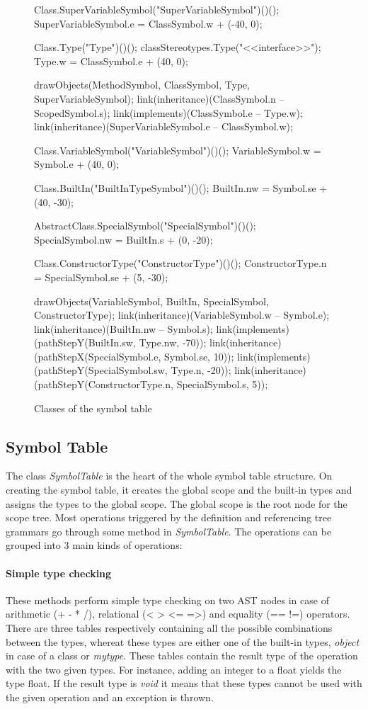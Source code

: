 \begin{figure}[H]
\begin{emp}[classdiag]
	Class.SuperVariableSymbol("SuperVariableSymbol")()();
	SuperVariableSymbol.e = ClassSymbol.w + (-40, 0);

	Class.Type("Type")()();
	classStereotypes.Type("<<interface>>");
	Type.w = ClassSymbol.e + (40, 0);

	drawObjects(MethodSymbol, ClassSymbol, Type, SuperVariableSymbol);
	link(inheritance)(ClassSymbol.n -- ScopedSymbol.s);
	link(implements)(ClassSymbol.e -- Type.w);
	link(inheritance)(SuperVariableSymbol.e -- ClassSymbol.w);


	Class.VariableSymbol("VariableSymbol")()();
	VariableSymbol.w = Symbol.e + (40, 0);

	Class.BuiltIn("BuiltInTypeSymbol")()();
	BuiltIn.nw = Symbol.se + (40, -30);

	AbstractClass.SpecialSymbol("SpecialSymbol")()();
	SpecialSymbol.nw = BuiltIn.s + (0, -20);

	Class.ConstructorType("ConstructorType")()();
	ConstructorType.n = SpecialSymbol.se + (5, -30);

	drawObjects(VariableSymbol, BuiltIn, SpecialSymbol, ConstructorType);
	link(inheritance)(VariableSymbol.w -- Symbol.e);
	link(inheritance)(BuiltIn.nw -- Symbol.s);
	link(implements)(pathStepY(BuiltIn.sw, Type.nw, -70));
	link(inheritance)(pathStepX(SpecialSymbol.e, Symbol.se, 10));
	link(implements)(pathStepY(SpecialSymbol.sw, Type.n, -20));
	link(inheritance)(pathStepY(ConstructorType.n, SpecialSymbol.s, 5));

	\end{emp}
	\caption{Classes of the symbol table}
	\label{fig:classes}
\end{figure}

\subsection{Symbol Table}
\label{sec:symbolTableDescription}

The class \emph{SymbolTable} is the heart of the whole symbol table structure.
On creating the symbol table, it creates the global scope and the built-in
types and assigns the types to the global scope. The global scope is the root
node for the scope tree. Most operations triggered by the definition and
referencing tree grammars go through some method in \emph{SymbolTable}.
The operations can be grouped into 3 main kinds of operations:

\paragraph{Simple type checking}
These methods perform simple type checking on two AST nodes in case of
arithmetic (+ - * /), relational (< > <= =>) and equality (== !=) operators.
There are three tables respectively containing all the possible combinations
between the types, whereat these types are either one of the built-in types,
\emph{object} in case of a class or \emph{mytype}. These tables contain the
result type of the operation with the two given types. For instance, adding
an integer to a float yields the type float. If the result type
is \emph{void} it means that these types cannot be used with the given
operation and an exception is thrown.

